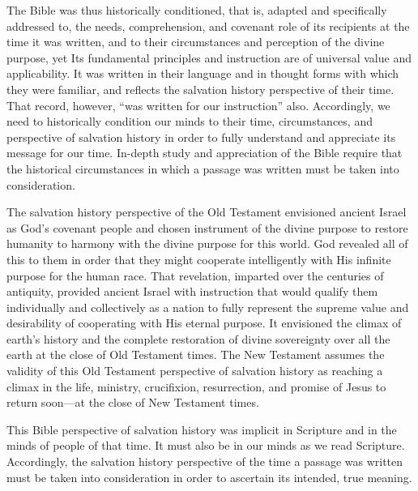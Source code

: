 The Bible was thus historically conditioned,\cite{55} that is, adapted and
specifically addressed to, the needs, comprehension, and covenant role of
its recipients at the time it was written, and to their circumstances and
perception of the divine purpose, yet Its fundamental principles and
instruction are of universal value and applicability. It was written in
their language and in thought forms with which they were familiar, and
reflects the salvation history perspective of their time. That record,
however, ``was written for our instruction'' also. Accordingly, we need to
historically condition our minds to their time, circumstances, and
perspective of salvation history in order to fully understand and appreciate
its message for our time. In-depth study and appreciation of the Bible
require that the historical circumstances in which a passage was written
must be taken into consideration.

The salvation history perspective of the Old Testament envisioned ancient
Israel as God's covenant people and chosen instrument of the divine purpose
to restore humanity to harmony with the divine purpose for this world. God
revealed all of this to them in order that they might cooperate
intelligently with His infinite purpose for the human race. That revelation,
imparted over the centuries of antiquity, provided ancient Israel with
instruction that would qualify them individually and collectively as a
nation to fully represent the supreme value and desirability of cooperating
with His eternal purpose. It envisioned the climax of earth's history and
the complete restoration of divine sovereignty over all the earth at the
close of Old Testament times. The New Testament assumes the validity of this
Old Testament perspective of salvation history as reaching a climax in the
life, ministry, crucifixion, resurrection, and promise of Jesus to return
soon---at the close of New Testament times.

This Bible perspective of salvation history was implicit in Scripture and in
the minds of people of that time. It must also be in our minds as we read
Scripture. Accordingly, the salvation history perspective of the time a
passage was written must be taken into consideration in order to ascertain
its intended, true meaning.

